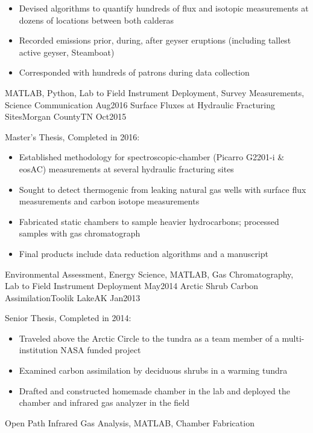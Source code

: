 \begin{experiences}
{\begin{itemize}
                        \item Devised algorithms to quantify hundreds of flux and isotopic measurements at dozens of locations between both calderas
                        \item Recorded emissions prior, during, after geyser eruptions (including tallest active geyser, Steamboat)
                        \item Corresponded with hundreds of patrons during data collection
                      \end{itemize}
                    }
                    {MATLAB, Python, Lab to Field Instrument Deployment, Survey Measurements, Science Communication}
  \emptySeparator
  \experience
  {Aug2016}       {Surface Fluxes at Hydraulic Fracturing Sites}{Morgan County}{TN}
  {Oct2015}       {
                   Master's Thesis, Completed in 2016:
                     \begin{itemize}
                        \item Established methodology for spectroscopic-chamber (Picarro G2201-i \& eosAC) measurements at several hydraulic fracturing sites 
                        \item Sought to detect thermogenic  from leaking natural gas wells with surface flux measurements and carbon isotope measurements
                        \item Fabricated static chambers to sample heavier hydrocarbons; processed samples with gas chromatograph          
                        \item Final products include data reduction algorithms and a manuscript                      
                      \end{itemize}
                    }
                    {Environmental Assessment, Energy Science, MATLAB, Gas Chromatography, Lab to Field Instrument Deployment}
  \emptySeparator
  \experience
  {May2014}        {Arctic Shrub Carbon Assimilation}{Toolik Lake}{AK}
  {Jan2013}        {
                    Senior Thesis, Completed in 2014:
                    \begin{itemize}
                        \item Traveled above the Arctic Circle to the tundra as a team member of a multi-institution NASA funded project      
                        \item Examined carbon assimilation by deciduous shrubs in a warming tundra           
                        \item Drafted and constructed homemade chamber in the lab and deployed the chamber and infrared gas analyzer in the field
                      \end{itemize}
                    }
                    {Open Path Infrared Gas Analysis, MATLAB, Chamber Fabrication} 
\end{experiences}
